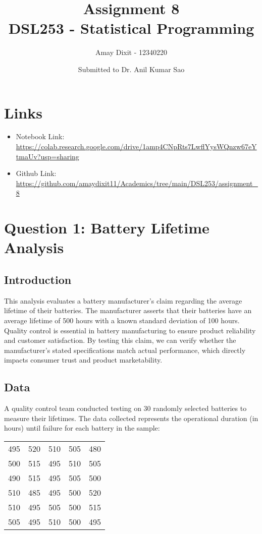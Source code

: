 \documentclass[12pt]{article}
\title{Assignment 8 \\ DSL253 - Statistical Programming}
\author{Amay Dixit - 12340220}
\date{Submitted to Dr. Anil Kumar Sao}
\begin{document}
\maketitle

\section*{Links}
\begin{sloppypar}
\begin{itemize}
    \item Notebook Link: \\ \url{https://colab.research.google.com/drive/1amp4CNpRts7LwflYysWQnzw67eYtmaUv?usp=sharing}
    \item Github Link: \\ \url{https://github.com/amaydixit11/Academics/tree/main/DSL253/assignment_8}
\end{itemize}
\end{sloppypar}

\section{Question 1: Battery Lifetime Analysis}

\subsection{Introduction}
This analysis evaluates a battery manufacturer's claim regarding the average lifetime of their batteries. The manufacturer asserts that their batteries have an average lifetime of 500 hours with a known standard deviation of 100 hours. Quality control is essential in battery manufacturing to ensure product reliability and customer satisfaction. By testing this claim, we can verify whether the manufacturer's stated specifications match actual performance, which directly impacts consumer trust and product marketability.

\subsection{Data}
A quality control team conducted testing on 30 randomly selected batteries to measure their lifetimes. The data collected represents the operational duration (in hours) until failure for each battery in the sample:

\begin{center}
\begin{tabular}{ccccc}
495 & 520 & 510 & 505 & 480 \\
500 & 515 & 495 & 510 & 505 \\
490 & 515 & 495 & 505 & 500 \\
510 & 485 & 495 & 500 & 520 \\
510 & 495 & 505 & 500 & 515 \\
505 & 495 & 510 & 500 & 495 \\
\end{tabular}
\end{center}
\end{document}
